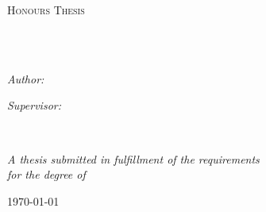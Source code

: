 \documentclass[
12pt, %
oneside, %
english, %
onehalfspacing, %
headsepline, %
]{MastersDoctoralThesis} %
\author{Cooper Wolfden}
\begin{document}
\frontmatter %

\pagestyle{plain} %


\begin{titlepage}
\begin{center}

\vspace*{.06\textheight}
{\scshape\LARGE \univname\par}\vspace{1.5cm} %
\textsc{\Large Honours Thesis}\\[0.5cm] %

\HRule\\[0.4cm] %
{\huge \bfseries \ttitle\par}\vspace{0.4cm} %
\HRule\\[1.5cm] %

\begin{minipage}[t]{0.4\textwidth}
\begin{flushleft} \large
\emph{Author:}\\
{\authorname} %
\end{flushleft}
\end{minipage}
\begin{minipage}[t]{0.4\textwidth}
\begin{flushright} \large
\emph{Supervisor:} \\
{\supname} %
\end{flushright}
\end{minipage}\\[3cm]

\vfill

\large \textit{A thesis submitted in fulfillment of the requirements\\ for the degree of \degreename}\\[0.3cm] %

\vfill

{\large \today}\\[4cm] %

\vfill
\end{center}
\end{titlepage}
\end{document}
